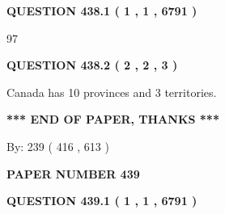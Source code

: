 \documentclass[12pt]{article}
\begin{document}
   
  
\vspace{0.2in}
  
{\textbf{\Large{QUESTION
438.1 
 ( 1 , 1 , 6791 )
}}}
  
  
 
 
\noindent{}

97
 
 
  
\vspace{0.2in}
  
{\textbf{\Large{QUESTION
438.2 
 ( 2 , 2 , 3 )
}}}
  
  
 
 
\noindent{}
 
 
Canada has 10  provinces and 3 territories.
 
 
 
 
   
   
 \vspace{0.2in}
 
   
   
   
   
\vspace{1.0in} 
{\textbf{\large{ *** END OF PAPER, THANKS *** }}} 
   
   
\hspace{1.0in} By: 
 239 ( 416 ,  613 )
   
   
   
   
\newpage 
\setcounter{page}{ 
   439001 } 
   
   
   
   
 {\textbf{ \Large{ PAPER NUMBER  439  }}}
   
   
\vspace{0.2in}
   
   
   
   
   
   
 \vspace{0.2in}
 
 
 
 
   
   
  
\vspace{0.2in}
  
{\textbf{\Large{QUESTION
439.1 
 ( 1 , 1 , 6791 )
}}}
  
\end{document}
